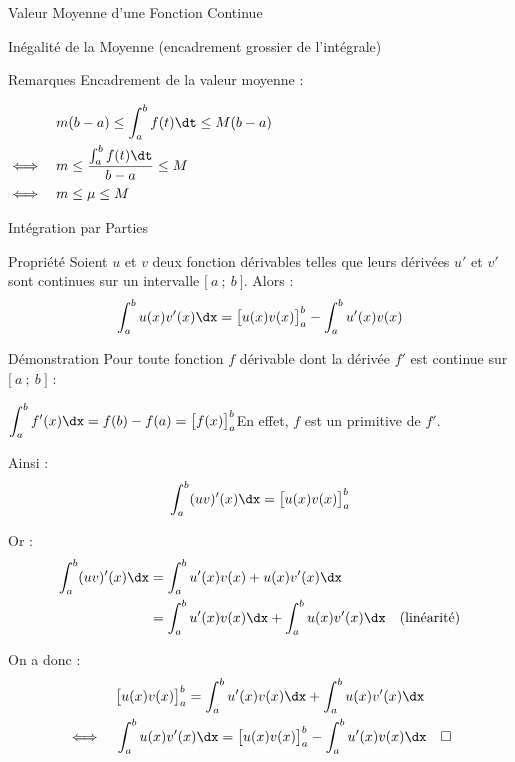 \documentclass{cours}
\begin{document}
\begin{Gpartie}{Valeur Moyenne d'une Fonction Continue}
\begin{Spartie}{Inégalité de la Moyenne (encadrement \og grossier \fg{} de l'intégrale)}
\begin{SSpartie}{Remarques}
                Encadrement de la valeur moyenne :

                $\begin{aligned}[t]
                    &\quad m(b-a)\leq\int_a^b f(t)\dt \leq M(b-a) \\
                    \iff&\quad m\leq\frac{\int_a^b f(t)\dt}{b-a}\leq M \\
                    \iff&\quad m\leq\mu\leq M
                \end{aligned}$
            \end{SSpartie}
        \end{Spartie}
    \end{Gpartie}
    \pagebreak
    \begin{Gpartie}{Intégration par Parties} 
        \begin{Spartie}{Propriété} 
            Soient $u$ et $v$ deux fonction dérivables telles que leurs dérivées $u'$ et $v'$ sont continues sur un intervalle $\big[~a~;~b~\big]$. Alors : \[\int_a^b u(x)v'(x)\dx=\big[u(x)v(x)\big]_a^b-\int_a^b u'(x)v(x)\]
            \begin{SSpartie}{Démonstration} 
                Pour toute fonction $f$ dérivable dont la dérivée $f'$ est continue sur $\big[~a~;~b~\big]$ :

                $\displaystyle \int_a^b f'(x)\dx=f(b)-f(a)=\big[f(x)\big]_a^b$\quad En effet, $f$ est un primitive de $f'$.

                Ainsi : \[\displaystyle \int_a^b (u v)'(x)\dx=\big[u(x)v(x)\big]_a^b\]

                Or : 
                \[\begin{aligned}[t]
                    \int_a^b (u v)'(x)\dx &= \int_a^b u'(x)v(x)+u(x)v'(x)\dx \\
                    &=\int_a^b u'(x)v(x)\dx + \int_a^b u(x)v'(x)\dx\quad\text{(linéarité)}
                \end{aligned}\]

                On a donc :
                \[\begin{aligned}[t]
                    &\quad\big[u(x)v(x)\big]_a^b = \int_a^b u'(x)v(x)\dx + \int_a^b u(x)v'(x)\dx \\
                    \iff&\quad\int_a^b u(x)v'(x)\dx=\big[u(x)v(x)\big]_a^b-\int_a^b u'(x)v(x)\dx\quad\square
                \end{aligned}\]
            \end{SSpartie}
        \end{Spartie}
    \end{Gpartie}
\end{document}

